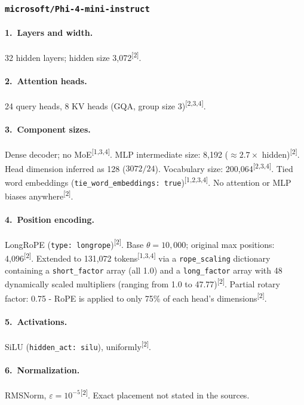 \documentclass[11pt, a4paper]{article}
\newcommand{\src}[1]{\textsuperscript{\normalfont\small[#1]}}
\begin{document}
\subsubsection{\texttt{microsoft/Phi-4-mini-instruct}}

\paragraph{1.~Layers and width.}
32 hidden layers; hidden size 3,072\src{2}.

\paragraph{2.~Attention heads.}
24 query heads, 8 KV heads (GQA, group size 3)\src{2,3,4}.

\paragraph{3.~Component sizes.}
Dense decoder; no MoE\src{1,3,4}.
MLP intermediate size: 8,192 ($\approx2.7\times$ hidden)\src{2}.
Head dimension inferred as 128 ($3072/24$).
Vocabulary size: 200,064\src{2,3,4}.
Tied word embeddings (\texttt{tie\_word\_embeddings: true})\src{1,2,3,4}.
No attention or MLP biases anywhere\src{2}.

\paragraph{4.~Position encoding.}
LongRoPE (\texttt{type: longrope})\src{2}.
Base $\theta=10{,}000$; original max positions: 4,096\src{2}.
Extended to 131,072 tokens\src{1,3,4} via a \texttt{rope\_scaling} dictionary
containing a \texttt{short\_factor} array (all 1.0) and a \texttt{long\_factor}
array with 48 dynamically scaled multipliers (ranging from 1.0 to 47.77)\src{2}.
Partial rotary factor: 0.75 - RoPE is applied to only 75\% of each head's
dimensions\src{2}.

\paragraph{5.~Activations.}
SiLU (\texttt{hidden\_act: silu}), uniformly\src{2}.

\paragraph{6.~Normalization.}
RMSNorm, $\varepsilon=10^{-5}$\src{2}.
Exact placement not stated in the sources.
\end{document}
